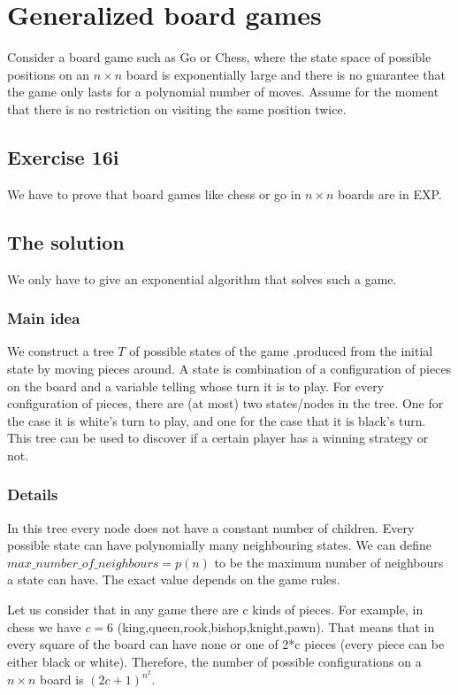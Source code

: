 \section*{Generalized board games}

Consider a board game such as Go or Chess, where the state space of possible
positions on an $n \times n$ board is exponentially large and there is no guarantee that the game
only lasts for a polynomial number of moves. Assume for the moment that there is no
restriction on visiting the same position twice.


\subsection*{Exercise 16i}

We have to prove that board games like chess or go in $n \times n$ boards are in EXP.

\subsection*{The solution}

We only have to give an exponential algorithm that solves such a 
game. 

\subsubsection*{Main idea}
We construct a tree $T$ of possible states of the game ,produced from the initial state by 
moving pieces around. A state is combination of a configuration of pieces on the board
 and a variable telling whose turn it is to play. For every configuration of pieces, there are
 (at most) two states/nodes in the tree. One for the case it is white's turn to play, and one 
for the case that it is black's turn. This tree can be used to discover if a certain player 
has a winning strategy or not.

\subsubsection*{Details}

In this tree every node does not have a constant number of children. Every possible state can have polynomially many 
neighbouring states. We can define $max\_number\_of\_neighbours = p(n)$ to be the maximum number of neighbours a state can 
have. The exact value depends on the game rules. 

Let us consider that in any game there are c kinds of pieces. For example, in chess we have $c=6$ (king,queen,rook,bishop,knight,pawn). That means that in 
every square of the board can have none or one of 2*c pieces (every piece can 
be either black or white).  Therefore, the number of possible 
configurations on a $n \times n$ board is $(2c+1)^{n^2}$. 


